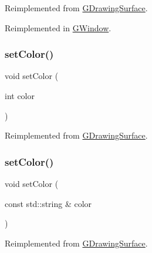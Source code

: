Reimplemented from \mbox{\hyperlink{classGDrawingSurface_ab4677ab2474e68b07aa56605af92a84a}{G\+Drawing\+Surface}}.



Reimplemented in \mbox{\hyperlink{classGWindow_a222fcfb542aa6094c7e0de671bd69627}{G\+Window}}.

\mbox{\label{classGForwardDrawingSurface_a292eb0ce61f3fdb1d28b17e1e34928f7}} 
\subsubsection{\texorpdfstring{set\+Color()}{setColor()}\hspace{0.1cm}{\footnotesize\ttfamily [1/2]}}
{\footnotesize\ttfamily void set\+Color (\begin{DoxyParamCaption}\item[{int}]{color }\end{DoxyParamCaption})\hspace{0.3cm}{\ttfamily [virtual]}}



Reimplemented from \mbox{\hyperlink{classGDrawingSurface_a75b9cb32ff80bf061791beb01a8433d0}{G\+Drawing\+Surface}}.

\mbox{\label{classGForwardDrawingSurface_ad148324da1b0340e84e24dffa577ffca}} 
\subsubsection{\texorpdfstring{set\+Color()}{setColor()}\hspace{0.1cm}{\footnotesize\ttfamily [2/2]}}
{\footnotesize\ttfamily void set\+Color (\begin{DoxyParamCaption}\item[{const std\+::string \&}]{color }\end{DoxyParamCaption})\hspace{0.3cm}{\ttfamily [virtual]}}



Reimplemented from \mbox{\hyperlink{classGDrawingSurface_a61374df6c11b52cfbb0815decdbaebc6}{G\+Drawing\+Surface}}.

